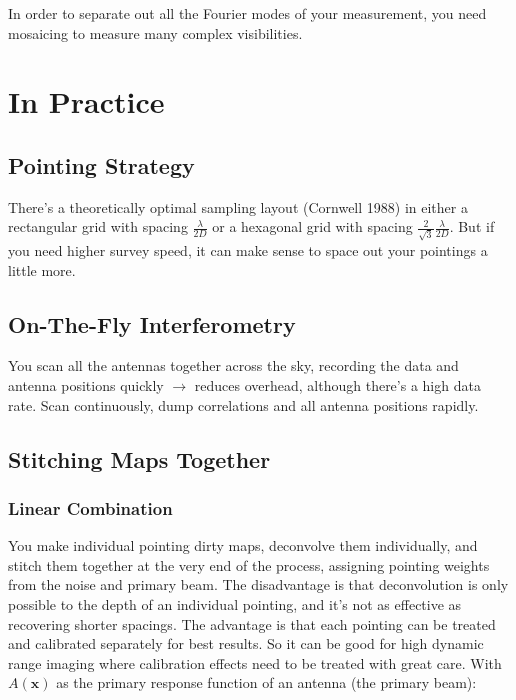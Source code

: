 \documentclass[a4paper]{article}
\newcommand{\xvec}{\mathbf{x}}
\begin{document}
In order to separate out all the Fourier modes of your measurement, you need mosaicing to measure many complex visibilities. 

\section{In Practice}

\subsection{Pointing Strategy}

There's a theoretically optimal sampling layout (Cornwell 1988) in either a rectangular grid with spacing $\frac{\lambda}{2D}$ or a hexagonal grid with spacing $\frac{2}{\sqrt{3}}\frac{\lambda}{2D}$. But if you need higher survey speed, it can make sense to space out your pointings a little more. 

\subsection{On-The-Fly Interferometry}

You scan all the antennas together across the sky, recording the data and antenna positions quickly $\rightarrow$ reduces overhead, although there's a high data rate. Scan continuously, dump correlations and all antenna positions rapidly. 

\subsection{Stitching Maps Together}

\subsubsection{Linear Combination}

You make individual pointing dirty maps, deconvolve them individually, and stitch them together at the very end of the process, assigning pointing weights from the noise and primary beam. The disadvantage is that deconvolution is only possible to the depth of an individual pointing, and it's not as effective as recovering shorter spacings. The advantage is that each pointing can be treated and calibrated separately for best results. So it can be good for high dynamic range imaging where calibration effects need to be treated with great care.
With $A(\xvec)$ as the primary response function of an antenna (the primary beam):
\end{document}
